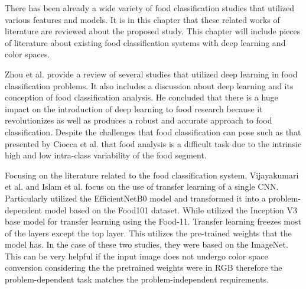 There has been already a wide variety of food classification studies that utilized various features and models. It is in this chapter that these related works of literature are reviewed about the proposed study. This chapter will include pieces of literature about existing food classification systems with deep learning and color spaces. 

Zhou et al.\cite{zhou-2019} provide a review of several studies that utilized deep learning in food classification problems. It also includes a discussion about deep learning and its conception of food classification analysis. He concluded that there is a huge impact on the introduction of deep learning to food research because it revolutionizes as well as produces a robust and accurate approach to food classification. Despite the challenges that food classification can pose such as that presented by Ciocca et al. \cite{ciocca-2019} that food analysis is a difficult task due to the intrinsic high and low intra-class variability of the food segment. 

Focusing on the literature related to the food classification system, Vijayakumari et al. \cite{vijayakumari-2022} and Islam et al. \cite{islam-2018} focus on the use of transfer learning of a single CNN. Particularly \cite{vijayakumari-2022} utilized the EfficientNetB0 model and transformed it into a problem-dependent model based on the Food101 \cite{bossard-2014} dataset. While \cite{islam-2018} utilized the Inception V3 base model for transfer learning using the Food-11. Transfer learning freezes most of the layers except the top layer. This utilizes the pre-trained weights that the model has. In the case of these two studies, they were based on the ImageNet. This can be very helpful if the input image does not undergo color space conversion considering the the pretrained weights were in RGB therefore the problem-dependent task matches the problem-independent requirements. 

